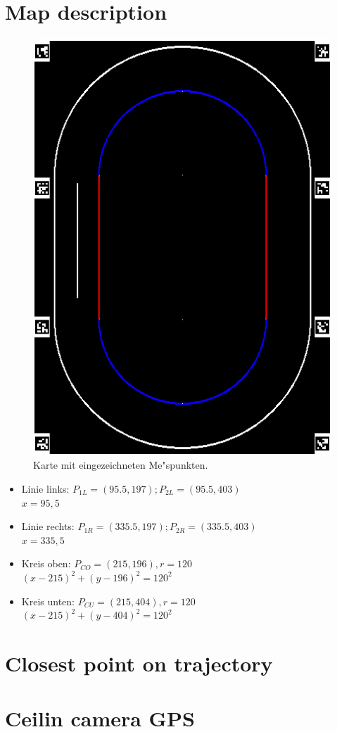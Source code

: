 \documentclass[10pt,oneside,a4paper]{article}
\begin{document}
  \section{Map description}
    \begin{figure}[h]
      \centering
      \includegraphics[scale=0.5]{pictures/map.png}
      \caption{Karte mit eingezeichneten Me"spunkten.}
    \end{figure}
    \begin{itemize}
      \item{Linie links:} \( P_{1L} = (95.5, 197); P_{2L} = (95.5, 403) \) \\
        \( x = 95,5 \)
      \item{Linie rechts:} \( P_{1R} = (335.5, 197); P_{2R} = (335.5, 403) \) \\
        \( x = 335,5 \)
      \item{Kreis oben:} \( P_{CO} = (215, 196), r = 120 \) \\
        \( (x - 215)^2 + (y - 196)^2 = 120^2 \)
      \item{Kreis unten:} \( P_{CU} = (215, 404), r = 120 \) \\
        \( (x - 215)^2 + (y - 404)^2 = 120^2 \)
    \end{itemize}

  \section{Closest point on trajectory}

  \section{Ceilin camera GPS}
\end{document}
